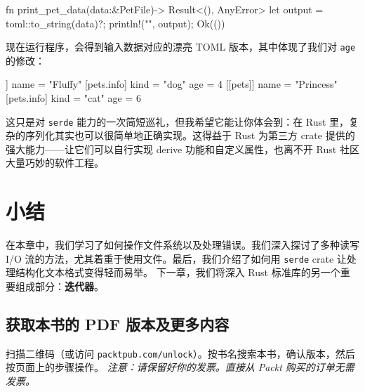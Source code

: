 \begin{codebox}[rust]
fn print_pet_data(data:&PetFile)-> Result<(), AnyError> {
    let output = toml::to_string(data)?;
    println!("{}", output);
    Ok(())
}
\end{codebox}
\label{idx:idx_c0e9a228}
现在运行程序，会得到输入数据对应的漂亮 TOML 版本，其中体现了我们对 \texttt{age} 的修改：
\begin{codeboxdark}
[[pets]]
name = "Fluffy"
[pets.info]
kind = "dog"
age = 4
[[pets]]
name = "Princess"
[pets.info]
kind = "cat"
age = 6
\end{codeboxdark}
\label{idx:idx_06768e7e}
这只是对 \texttt{serde} 能力的一次简短巡礼，但我希望它能让你体会到：在 Rust 里，复杂的序列化其实也可以很简单地正确实现。这得益于 Rust 为第三方 crate 提供的强大能力——让它们可以自行实现 derive 功能和自定义属性，也离不开 Rust 社区大量巧妙的软件工程。
\section{小结}
在本章中，我们学习了如何操作文件系统以及处理错误。我们深入探讨了多种读写 I/\allowbreak{}O 流的方法，尤其着重于使用文件。最后，我们介绍了如何用 \texttt{serde} crate 让处理结构化文本格式变得轻而易举。
下一章，我们将深入 Rust 标准库的另一个重要组成部分：\textbf{迭代器}。
\begin{samepage}
\subsection{获取本书的 PDF 版本及更多内容}
扫描二维码（或访问 \texttt{packtpub.\allowbreak{}com/\allowbreak{}unlock}）。按书名搜索本书，确认版本，然后按页面上的步骤操作。
\emph{注意：请保留好你的发票。直接从 Packt 购买的订单无需发票。}
\end{samepage}
